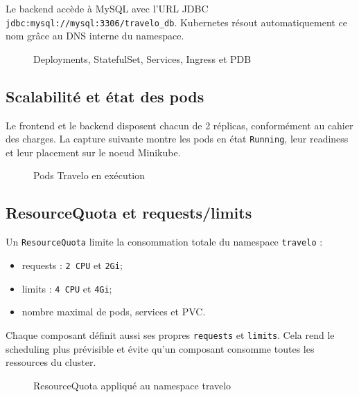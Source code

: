 \documentclass[11pt,a4paper]{article}
\begin{document}
Le backend accède à MySQL avec l'URL JDBC \texttt{jdbc:mysql://mysql:3306/travelo\_db}. Kubernetes résout automatiquement ce nom grâce au DNS interne du namespace.

\begin{figure}[H]
    \centering
    
    \caption{Deployments, StatefulSet, Services, Ingress et PDB}
\end{figure}

\subsection{Scalabilité et état des pods}

Le frontend et le backend disposent chacun de 2 réplicas, conformément au cahier des charges. La capture suivante montre les pods en état \texttt{Running}, leur readiness et leur placement sur le noeud Minikube.

\begin{figure}[H]
    \centering
    
    \caption{Pods Travelo en exécution}
\end{figure}

\subsection{ResourceQuota et requests/limits}

Un \texttt{ResourceQuota} limite la consommation totale du namespace \texttt{travelo} :
\begin{itemize}
    \item requests : \texttt{2 CPU} et \texttt{2Gi};
    \item limits : \texttt{4 CPU} et \texttt{4Gi};
    \item nombre maximal de pods, services et PVC.
\end{itemize}

Chaque composant définit aussi ses propres \texttt{requests} et \texttt{limits}. Cela rend le scheduling plus prévisible et évite qu'un composant consomme toutes les ressources du cluster.

\begin{figure}[H]
    \centering
    
    \caption{ResourceQuota appliqué au namespace travelo}
\end{figure}
\end{document}
